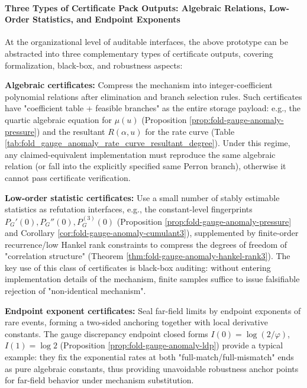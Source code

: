 \paragraph{Three Types of Certificate Pack Outputs: Algebraic Relations, Low-Order Statistics, and Endpoint Exponents}
At the organizational level of auditable interfaces, the above prototype can be abstracted into three complementary types of certificate outputs, covering formalization, black-box, and robustness aspects:
\par
\textbf{Algebraic certificates:}
Compress the mechanism into integer-coefficient polynomial relations after elimination and branch selection rules.
Such certificates have "coefficient table + feasible branches" as the entire storage payload: e.g., the quartic algebraic equation for \(\mu(u)\) (Proposition \ref{prop:fold-gauge-anomaly-pressure}) and the resultant \(R(\alpha,u)\) for the rate curve (Table \ref{tab:fold_gauge_anomaly_rate_curve_resultant_degree}).
Under this regime, any claimed-equivalent implementation must reproduce the same algebraic relation (or fall into the explicitly specified same Perron branch), otherwise it cannot pass certificate verification.
\par
\textbf{Low-order statistic certificates:}
Use a small number of stably estimable statistics as refutation interfaces, e.g., the constant-level fingerprints \(P_G'(0),P_G''(0),P_G^{(3)}(0)\) (Proposition \ref{prop:fold-gauge-anomaly-pressure} and Corollary \ref{cor:fold-gauge-anomaly-cumulant3}), supplemented by finite-order recurrence/low Hankel rank constraints to compress the degrees of freedom of "correlation structure" (Theorem \ref{thm:fold-gauge-anomaly-hankel-rank3}).
The key use of this class of certificates is black-box auditing: without entering implementation details of the mechanism, finite samples suffice to issue falsifiable rejection of "non-identical mechanism".
\par
\textbf{Endpoint exponent certificates:}
Seal far-field limits by endpoint exponents of rare events, forming a two-sided anchoring together with local derivative constants.
The gauge discrepancy endpoint closed forms \(I(0)=\log(2/\varphi)\), \(I(1)=\log 2\) (Proposition \ref{prop:fold-gauge-anomaly-ldp}) provide a typical example: they fix the exponential rates at both "full-match/full-mismatch" ends as pure algebraic constants, thus providing unavoidable robustness anchor points for far-field behavior under mechanism substitution.

